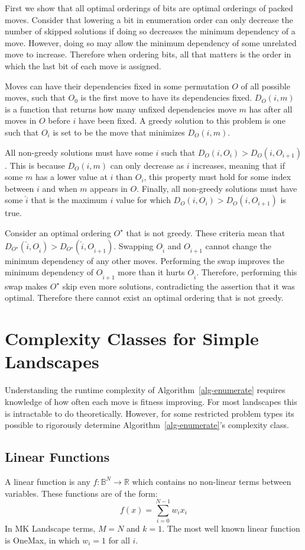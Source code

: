 \documentclass[runningheads,a4paper]{llncs}
\begin{document}
First we show that all optimal orderings of bits are optimal orderings of packed moves.
Consider that lowering a bit in enumeration order can only decrease the number of skipped
solutions if doing so decreases the minimum dependency of a move. However, doing so may
allow the minimum dependency of some unrelated move to increase. Therefore when ordering
bits, all that matters is the order in which the last bit of each move is assigned.

Moves can have their dependencies fixed in some permutation $O$ of all possible moves,
such that $O_0$ is the first move to have its dependencies fixed.
$D_O(i, m)$ is a function that returns how many unfixed dependencies move $m$ has after all
moves in $O$ before $i$ have been fixed. A greedy solution to this problem is one such
that $O_i$ is set to be the move that minimizes $D_O(i, m)$.

All non-greedy solutions must have some $i$ such that $D_O(i, O_i) > D_O(i, O_{i+1})$.
This is because $D_O(i, m)$ can only decrease as $i$ increases, meaning that if some $m$
has a lower value at $i$ than $O_i$, this property must hold for
some index between $i$ and when $m$ appears in $O$.
Finally, all non-greedy solutions must have some $\hat{i}$
that is the maximum $i$ value for which $D_O(i, O_i) > D_O(i, O_{i+1})$ is true. 

Consider an optimal ordering $O^\star$ that is not greedy.
These criteria mean that $D_{O^\star}(\hat{i}, O_{\hat{i}}) > D_{O^\star}(\hat{i}, O_{\hat{i}+1})$.
Swapping $O_{\hat{i}}$ and $O_{\hat{i}+1}$ cannot change the minimum dependency of any other moves.
Performing the swap improves the minimum dependency of $O_{\hat{i}+1}$ more than it hurts
$O_{\hat{i}}$. Therefore, performing this swap makes $O^\star$ skip even more solutions,
contradicting the assertion that it was optimal. Therefore there cannot exist an optimal ordering that is not greedy.

\section{Complexity Classes for Simple Landscapes}
Understanding the runtime complexity of Algorithm~\ref{alg-enumerate} requires
knowledge of how often each move is fitness improving. For most landscapes
this is intractable to do theoretically. However, for some restricted problem
types its possible to rigorously determine Algorithm~\ref{alg-enumerate}'s complexity class.

\subsection{Linear Functions}
A linear function is any $f : \mathbb{B}^{N}\rightarrow \mathbb{R}$ which contains
no non-linear terms between variables. These functions are of the form:
\begin{equation}
  f(x) = \sum_{i=0}^{N-1} w_ix_i
  \label{eq-linear}
\end{equation}
In MK Landscape terms, $M=N$ and $k=1$. The most well known linear function is OneMax,
in which $w_i=1$ for all $i$.
\end{document}
